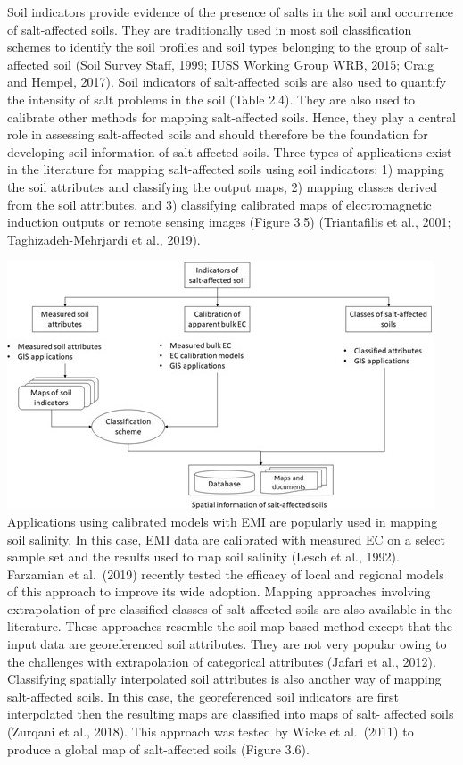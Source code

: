 \documentclass[
  10pt,
  b5paper,
]{book}
\begin{document}
Soil indicators provide evidence of the presence of salts in the soil and occurrence of salt-affected soils. They are traditionally used in most soil classification schemes to identify the soil profiles and soil types belonging to the group of salt-affected soil (Soil Survey Staff, 1999; IUSS Working Group WRB, 2015; Craig and Hempel, 2017). Soil indicators of salt-affected soils are also used to quantify the intensity of salt problems in the soil (Table 2.4). They are also used to calibrate other methods for mapping salt-affected soils. Hence, they play a central role in assessing salt-affected soils and should therefore be the foundation for developing soil information of salt-affected soils.
Three types of applications exist in the literature for mapping salt-affected soils using soil indicators: 1) mapping the soil attributes and classifying the output maps, 2) mapping classes derived from the soil attributes, and 3) classifying calibrated maps of electromagnetic induction outputs or remote sensing images (Figure 3.5) (Triantafilis et al., 2001; Taghizadeh-Mehrjardi et al., 2019).

\includegraphics{figures/images/Figure3.5.jpg}
Applications using calibrated models with EMI are popularly used in mapping soil salinity. In this case, EMI data are calibrated with measured EC on a select sample set and the results used to map soil salinity (Lesch et al., 1992). Farzamian et al.~(2019) recently tested the efficacy of local and regional models of this approach to improve its wide adoption. Mapping approaches involving extrapolation of pre-classified classes of salt-affected soils are also available in the literature. These approaches resemble the soil-map based method except that the input data are georeferenced soil attributes. They are not very popular owing to the challenges with extrapolation of categorical attributes (Jafari et al., 2012). Classifying spatially interpolated soil attributes is also another way of mapping salt-affected soils. In this case, the georeferenced soil indicators are first interpolated then the resulting maps are classified into maps of salt- affected soils (Zurqani et al., 2018). This approach was tested by Wicke et al.~(2011) to produce a global map of salt-affected soils (Figure 3.6).
\end{document}
